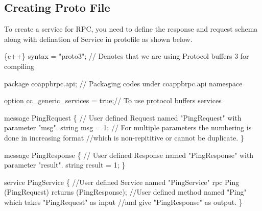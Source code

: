 \subsection*{Creating Proto File}

To create a service for R\+PC, you need to define the response and request schema along with defination of Service in protofile as shown below. 
\begin{DoxyCode}
\{c++\}
syntax = "proto3"; // Denotes that we are using Protocol buffers 3 for compiling

package coappbrpc.api; // Packaging codes under coappbrpc.api namespace

option cc\_generic\_services = true;// To use protocol buffers services

message PingRequest \{  // User defined Request named "PingRequest" with parameter "msg". 
    string msg = 1; // For multiple parameters the numbering is done in increasing format 
    //which is non-repititive or cannot be duplicate.
\}

message PingResponse \{  // User defined Response named "PingResponse" with parameter "result". 
    string result = 1;
\}

service PingService \{ //User defined Service named "PingService" 
    rpc Ping (PingRequest) returns (PingResponse); //User defined method named "Ping" which takes
       "PingRequest" as input 
    //and give "PingResponse" as output.
\}
\end{DoxyCode}


